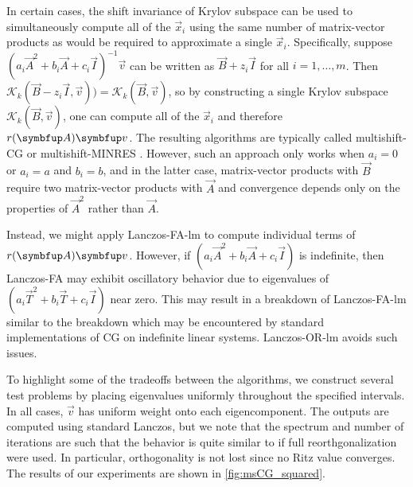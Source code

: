 In certain cases, the shift invariance of Krylov subspace can be used to simultaneously compute all of the $\vec{x}_i$ using the same number of matrix-vector products as would be required to approximate a single $\vec{x}_i$.
Specifically, suppose $(a_i\vec{A}^2 + b_i \vec{A} + c_i \vec{I})^{-1} \vec{v}$ can be written as $\vec{B}+z_i \vec{I}$ for all $i=1,\ldots, m$.
Then $\mathcal{K}_k(\vec{B}-z_i\vec{I},\vec{v})) = \mathcal{K}_k(\vec{B},\vec{v})$, so by constructing a single Krylov subspace $\mathcal{K}_k(\vec{B},\vec{v})$, one can compute all of the $\vec{x}_i$ and therefore $r\A\vec{v}$.
The resulting algorithms are typically called multishift-CG or multishift-MINRES \cite{eshof_frommer_lippert_schilling_van_der_vorst_02,frommer_simoncini_08,frommer_simoncini_08,guttel_schweitzer_21,pleiss_jankowiak_eriksson_damle_gardner_20}.
However, such an approach only works when $a_i = 0$ or $a_i = a$ and $b_i = b$, and in the latter case, matrix-vector products with $\vec{B}$ require two matrix-vector products with $\vec{A}$ and convergence depends only on the properties of $\vec{A}^2$ rather than $\vec{A}$.

Instead, we might apply Lanczos-FA-lm to compute individual terms of $r\A\vec{v}$.
However, if $(a_i\vec{A}^2 + b_i \vec{A} + c_i \vec{I})$ is indefinite, then Lanczos-FA may exhibit oscillatory behavior due to eigenvalues of $(a_i\vec{T}^2 + b_i \vec{T} + c_i \vec{I})$ near zero.
This may result in a breakdown of Lanczos-FA-lm similar to the breakdown which may be encountered by standard implementations of CG on indefinite linear systems.
Lanczos-OR-lm avoids such issues.

To highlight some of the tradeoffs between the algorithms, we construct several test problems by placing eigenvalues uniformly throughout the specified intervals.
In all cases, $\vec{v}$ has uniform weight onto each eigencomponent.
The outputs are computed using standard Lanczos, but we note that the spectrum and number of iterations are such that the behavior is quite similar to if full reorthgonalization were used. 
In particular, orthogonality is not lost since no Ritz value converges. 
The results of our experiments are shown in \cref{fig:msCG_squared}.

